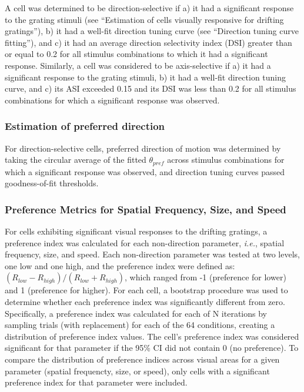 A cell was determined to be direction-selective if a) it had a significant response to the grating stimuli (see ``Estimation of cells visually responsive for drifting gratings''), b) it had a well-fit direction tuning curve (see ``Direction tuning curve fitting''), and c) it had an average direction selectivity index (DSI) greater than or equal to 0.2\cite{Liang2018} for all stimulus combinations to which it had a significant response. Similarly, a cell was considered to be axis-selective if a) it had a significant response to the grating stimuli, b) it had a well-fit direction tuning curve, and c) its ASI exceeded 0.15 and its DSI was less than 0.2 for all stimulus combinations for which a significant response was observed.

\subsubsection{Estimation of preferred direction}
For direction-selective cells, preferred direction of motion was determined by taking the circular average of the fitted $\theta_{pref}$ across stimulus combinations for which a significant response was observed, and direction tuning curves passed goodness-of-fit thresholds. 

\subsubsection{Preference Metrics for Spatial Frequency, Size, and Speed}
For cells exhibiting significant visual responses to the drifting gratings, a preference index was calculated for each non-direction parameter, \textit{i.e.}, spatial frequency, size, and speed. Each non-direction parameter was tested at two levels, one low and one high, and the preference index were defined as:  $(R_{low}-R_{high})/(R_{low}+R_{high})$, which ranged from -1 (preference for lower) and 1 (preference for higher). For each cell, a bootstrap procedure was used to determine whether each preference index was significantly different from zero. Specifically, a preference index was calculated for each of N iterations by sampling trials (with replacement) for each of the 64 conditions, creating a distribution of preference index values. The cell's preference index was considered significant for that parameter if the 95\% CI did not contain 0 (no preference). To compare the distribution of preference indices across visual areas for a given parameter (spatial frequencty, size, or speed), only cells with a significant preference index for that parameter were included.

